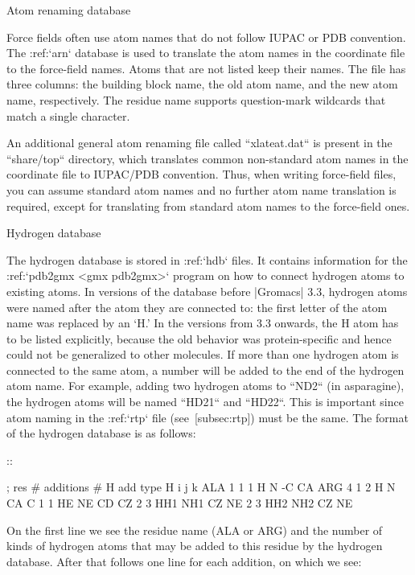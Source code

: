 Atom renaming database
~~~~~~~~~~~~~~~~~~~~~~

Force fields often use atom names that do not follow IUPAC or PDB
convention. The :ref:`arn` database is used to translate the
atom names in the coordinate file to the force-field names. Atoms that
are not listed keep their names. The file has three columns: the
building block name, the old atom name, and the new atom name,
respectively. The residue name supports question-mark wildcards that
match a single character.

An additional general atom renaming file called
``xlateat.dat`` is present in the ``share/top``
directory, which translates common non-standard atom names in the
coordinate file to IUPAC/PDB convention. Thus, when writing force-field
files, you can assume standard atom names and no further atom name
translation is required, except for translating from standard atom names
to the force-field ones.

Hydrogen database
~~~~~~~~~~~~~~~~~

The hydrogen database is stored in :ref:`hdb` files. It contains information
for the :ref:`pdb2gmx <gmx pdb2gmx>` program on how to connect hydrogen atoms to existing
atoms. In versions of the database before |Gromacs| 3.3, hydrogen atoms
were named after the atom they are connected to: the first letter of the
atom name was replaced by an ‘H.’ In the versions from 3.3 onwards, the
H atom has to be listed explicitly, because the old behavior was
protein-specific and hence could not be generalized to other molecules.
If more than one hydrogen atom is connected to the same atom, a number
will be added to the end of the hydrogen atom name. For example, adding
two hydrogen atoms to ``ND2`` (in asparagine), the hydrogen atoms will
be named ``HD21`` and ``HD22``. This is important since atom naming in
the :ref:`rtp` file (see [subsec:rtp]) must be the same. The format of the
hydrogen database is as follows:

::

    ; res   # additions
            # H add type    H       i       j       k
    ALA     1
            1       1       H       N       -C      CA
    ARG     4
            1       2       H       N       CA      C
            1       1       HE      NE      CD      CZ
            2       3       HH1     NH1     CZ      NE
            2       3       HH2     NH2     CZ      NE

On the first line we see the residue name (ALA or ARG) and the number of
kinds of hydrogen atoms that may be added to this residue by the
hydrogen database. After that follows one line for each addition, on
which we see:

